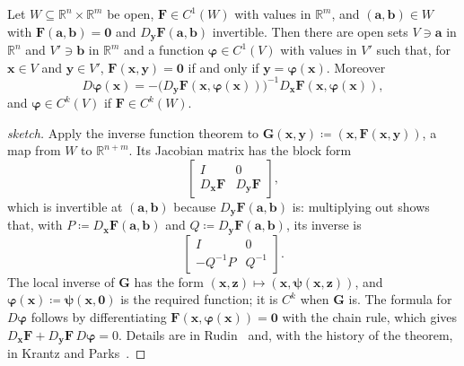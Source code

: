 \begin{theorem}
\label{thm:implicit-function}
Let $W\subseteq\mathbb R^n\times\mathbb R^m$ be open, $\mathbf F\in C^1(W)$ with values in $\mathbb R^m$, and $(\mathbf a,\mathbf b)\in W$ with $\mathbf F(\mathbf a,\mathbf b)=\mathbf0$ and $D_{\mathbf y}\mathbf F(\mathbf a,\mathbf b)$ invertible. Then there are open sets $V\ni\mathbf a$ in $\mathbb R^n$ and $V'\ni\mathbf b$ in $\mathbb R^m$ and a function $\boldsymbol\varphi\in C^1(V)$ with values in $V'$ such that, for $\mathbf x\in V$ and $\mathbf y\in V'$, $\mathbf F(\mathbf x,\mathbf y)=\mathbf0$ if and only if $\mathbf y=\boldsymbol\varphi(\mathbf x)$. Moreover
\[
D\boldsymbol\varphi(\mathbf x)=-\bigl(D_{\mathbf y}\mathbf F(\mathbf x,\boldsymbol\varphi(\mathbf x))\bigr)^{-1}D_{\mathbf x}\mathbf F(\mathbf x,\boldsymbol\varphi(\mathbf x)),
\]
and $\boldsymbol\varphi\in C^k(V)$ if $\mathbf F\in C^k(W)$.
\end{theorem}

\begin{proof}[sketch]
Apply the inverse function theorem to $\mathbf G(\mathbf x,\mathbf y)\coloneqq(\mathbf x,\mathbf F(\mathbf x,\mathbf y))$, a map from $W$ to $\mathbb R^{n+m}$. Its Jacobian matrix has the block form
\[
\begin{bmatrix}I&0\\D_{\mathbf x}\mathbf F&D_{\mathbf y}\mathbf F\end{bmatrix},
\]
which is invertible at $(\mathbf a,\mathbf b)$ because $D_{\mathbf y}\mathbf F(\mathbf a,\mathbf b)$ is: multiplying out shows that, with $P\coloneqq D_{\mathbf x}\mathbf F(\mathbf a,\mathbf b)$ and $Q\coloneqq D_{\mathbf y}\mathbf F(\mathbf a,\mathbf b)$, its inverse is
\[
\begin{bmatrix}I&0\\-Q^{-1}P&Q^{-1}\end{bmatrix}.
\]
The local inverse of $\mathbf G$ has the form $(\mathbf x,\mathbf z)\mapsto(\mathbf x,\boldsymbol\psi(\mathbf x,\mathbf z))$, and $\boldsymbol\varphi(\mathbf x)\coloneqq\boldsymbol\psi(\mathbf x,\mathbf0)$ is the required function; it is $C^k$ when $\mathbf G$ is. The formula for $D\boldsymbol\varphi$ follows by differentiating $\mathbf F(\mathbf x,\boldsymbol\varphi(\mathbf x))=\mathbf0$ with the chain rule, which gives $D_{\mathbf x}\mathbf F+D_{\mathbf y}\mathbf F\,D\boldsymbol\varphi=0$. Details are in Rudin~\cite[Thm.~9.28]{rudin1976} and, with the history of the theorem, in Krantz and Parks~\cite{krantz2002ift}.
\end{proof}

